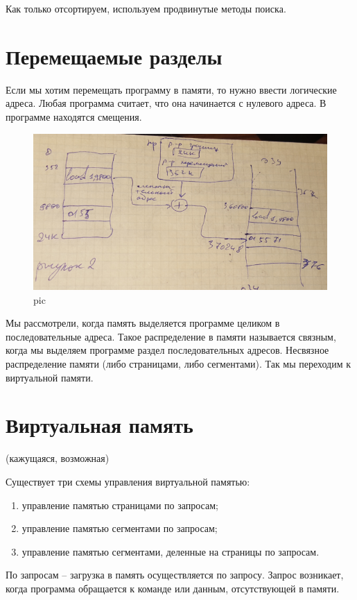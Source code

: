 Как только отсортируем, используем продвинутые методы поиска.

\section{Перемещаемые разделы}

Если мы хотим перемещать программу в памяти, то нужно ввести логические адреса. Любая программа считает, что она начинается с нулевого адреса. В программе находятся смещения.

\begin{figure}[H]
    \centering
    \includegraphics[width=\textwidth]{pic/2.png}
    \caption{pic}
\end{figure}

Мы рассмотрели, когда память выделяется программе целиком в последовательные адреса. Такое распределение в памяти называется связным, когда мы выделяем программе раздел последовательных адресов. Несвязное распределение памяти (либо страницами, либо сегментами). Так мы переходим к виртуальной памяти.

\section{Виртуальная память}
(кажущаяся, возможная)

Существует три схемы управления виртуальной памятью:
\begin{enumerate}
    \item управление памятью страницами по запросам;
    \item управление памятью сегментами по запросам;
    \item управление памятью сегментами, деленные на страницы по запросам.
\end{enumerate} 

По запросам – загрузка в память осуществляется по запросу. Запрос возникает, когда программа обращается к команде или данным, отсутствующей в памяти. 

